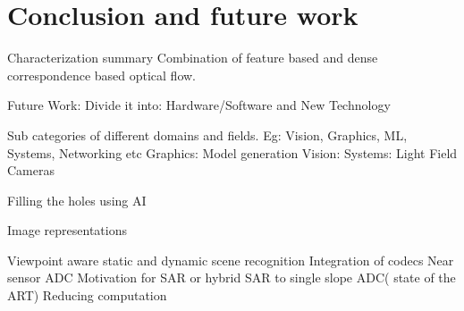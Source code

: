 \chapter{Conclusion and future work}

Characterization summary
Combination of feature based and dense correspondence based optical flow. 

Future Work:
Divide it into:
Hardware/Software and New Technology

Sub categories of different domains and fields. 
Eg: Vision, Graphics, ML, Systems, Networking etc
Graphics: Model generation 
Vision: 
Systems: Light Field Cameras

Filling the holes using AI

Image representations

Viewpoint aware static and dynamic scene recognition
Integration of codecs 
Near sensor ADC
Motivation for SAR or hybrid SAR to single slope ADC( state of the ART)
Reducing computation 
